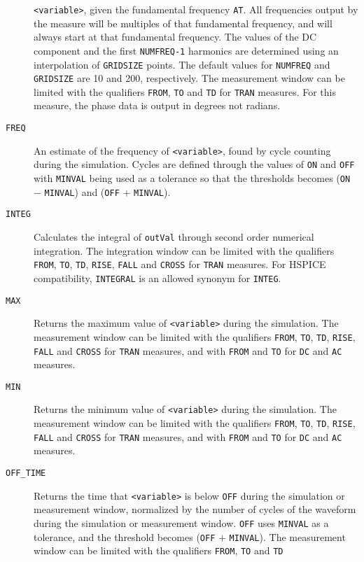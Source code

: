 \begin{Command}
\begin{Arguments}
\begin{description}
    {\tt <variable>}, given the fundamental frequency {\tt AT}.  All frequencies output 
    by the measure will be multiples of that fundamental frequency, and will always start 
    at that fundamental frequency. The values of the DC component and the
    first {\tt NUMFREQ-1} harmonics are determined using an interpolation of {\tt GRIDSIZE} points.
    The default values for {\tt NUMFREQ} and {\tt GRIDSIZE} are 10 and 200, respectively.  
    The measurement window can be limited with the qualifiers {\tt FROM}, {\tt TO} 
    and {\tt TD} for {\tt TRAN} measures.  For this measure, the phase data is output in
    degrees not radians.
  \item[\tt FREQ] An estimate of the frequency of {\tt <variable>}, found by cycle counting
    during the simulation.  Cycles are defined through the values of {\tt ON}
    and {\tt OFF} with {\tt MINVAL} being used as a tolerance so that the thresholds
    becomes ({\tt ON} $-$ {\tt MINVAL}) and ({\tt OFF} $+$ {\tt MINVAL}).     
  \item[\tt INTEG] Calculates the integral of {\tt outVal} through second order numerical
    integration.  The integration window can be limited with the qualifiers {\tt FROM},
    {\tt TO}, {\tt TD}, {\tt RISE}, {\tt FALL} and {\tt CROSS} for {\tt TRAN} measures.
    For HSPICE compatibility, {\tt INTEGRAL} is an allowed synonym for {\tt INTEG}.
  \item[\tt MAX]  Returns the maximum value of {\tt <variable>} during the simulation.
    The measurement window can be limited with the qualifiers {\tt FROM}, {\tt TO}, 
    {\tt TD}, {\tt RISE}, {\tt FALL} and {\tt CROSS} for {\tt TRAN} measures, and
    with {\tt FROM} and {\tt TO} for {\tt DC} and {\tt AC} measures. 
  \item[\tt MIN] Returns the minimum value of {\tt <variable>} during the simulation.
    The measurement window can be limited with the qualifiers {\tt FROM}, {\tt TO}, 
    {\tt TD}, {\tt RISE}, {\tt FALL} and {\tt CROSS} for {\tt TRAN} measures, and
    with {\tt FROM} and {\tt TO} for {\tt DC} and {\tt AC} measures. 
  \item[\tt OFF\_TIME] Returns the time that {\tt <variable>} is below {\tt OFF} during the 
    simulation or measurement window, normalized by the number of cycles of the waveform 
    during the simulation or measurement window.
    {\tt OFF} uses {\tt MINVAL} as a tolerance, and the threshold becomes ({\tt OFF} $+$ {\tt MINVAL}). 
    The measurement window can be limited with the qualifiers {\tt FROM}, {\tt TO} and {\tt TD}

\end{description}
\end{Arguments}
\end{Command}
